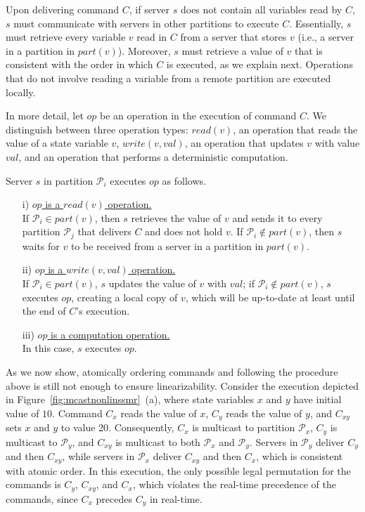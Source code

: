 \documentclass[11pt]{article}
\newcommand{\ppm}{\mathcal{P}}
\begin{document}
Upon delivering command $C$, if server $s$ does not contain all variables read by $C$, $s$ must communicate with servers in other partitions to execute $C$. 
Essentially, $s$ must retrieve every variable $v$ read in $C$ from a server that stores $v$ (i.e., a server in a partition in $part(v)$).
Moreover, $s$ must retrieve a value of $v$ that is consistent with the order in which $C$ is executed, as we explain next.
Operations that do not involve reading a variable from a remote partition are executed locally.

In more detail, let $op$ be an operation in the execution of command $C$.
We distinguish between three operation types: $read(v)$, an operation that reads the value of a state variable $v$, $write(v, val)$, an operation that updates $v$ with value $val$,
and an operation that performs a deterministic computation.

Server $s$ in partition $\ppm_i$ executes $op$ as follows.

\begin{itemize}

\item[i)] \underline{$op$ is a $read(v)$ operation.} \\
If $\ppm_i \in part(v)$, then $s$ retrieves the value of $v$ and sends it to every partition $\ppm_j$ that delivers $C$ and does not hold $v$. If $\ppm_i \not\in part(v)$, then $s$ waits for $v$ to be received from a server in a partition in $part(v)$.

\item[ii)] \underline{$op$ is a $write(v,val)$ operation.} \\
If $\ppm_i \in part(v)$, $s$ updates the value of $v$ with $val$; if $\ppm_i \not\in part(v)$, $s$ executes $op$, creating a local copy of $v$, which will be up-to-date at least until the end of $C$'s execution.

\item[iii)] \underline{$op$ is a computation operation.}\\
In this case, $s$ executes $op$.

\end{itemize}


As we now show, atomically ordering commands and following the procedure above is still not enough to ensure linearizability.
Consider the execution depicted in Figure~\ref{fig:mcastnonlinssmr}~(a), where state variables $x$ and $y$ have initial value of $10$. 
Command $C_x$ reads the value of $x$, $C_y$ reads the value of $y$, and $C_{xy}$ sets $x$ and $y$ to value 20.
Consequently, $C_x$ is multicast to partition $\ppm_x$, $C_y$ is multicast to $\ppm_y$, and $C_{xy}$ is multicast to both $\ppm_x$ and $\ppm_y$. 
Servers in $\ppm_y$ deliver $C_y$ and then $C_{xy}$, while servers in $\ppm_x$ deliver $C_{xy}$ and then $C_x$, which is consistent with atomic order. 
In this execution, the only possible legal permutation for the commands is $C_y$, $C_{xy}$, and $C_x$, which violates the real-time precedence of the commands, since $C_x$ precedes $C_y$ in real-time.
\end{document}
